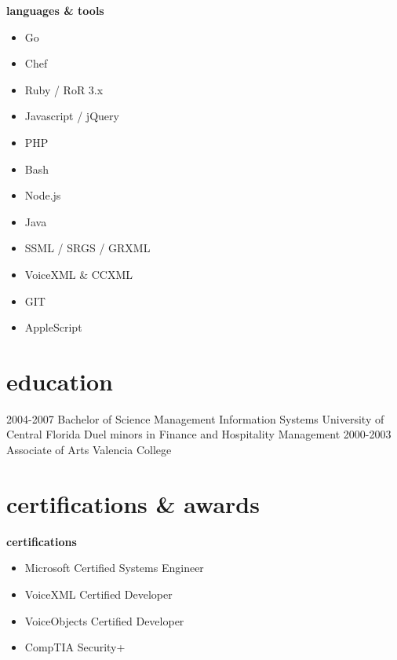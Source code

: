 \documentclass[]{friggeri-cv} %
\begin{document}
  \textbf{languages \& tools}
    \begin{multicols}{3}
      \begin{itemize}
        \item Go
        \item Chef
        \item Ruby / RoR 3.x
        \item Javascript / jQuery
        \item PHP
        \item Bash
        \item Node.js
        \item Java
        \item SSML / SRGS / GRXML
        \item VoiceXML \& CCXML
        \item GIT
        \item AppleScript
      \end{itemize}
    \end{multicols}


\section{education}

  \begin{entrylist}
    \entry
      {2004-2007}
      {Bachelor of Science {\normalfont Management Information Systems}}
      {University of Central Florida}
      {Duel minors in Finance and Hospitality Management }
    \entry
      {2000-2003}
      {Associate {\normalfont of Arts}}
      {Valencia College}
      {}
  \end{entrylist}

\section{certifications \& awards}
  \textbf{certifications}
    \begin{multicols}{2}
      \begin{itemize}
        \item Microsoft Certified Systems Engineer
        \item VoiceXML Certified Developer
        \item VoiceObjects Certified Developer
        \item CompTIA Security+
      \end{itemize}
    \end{multicols}
\end{document}
